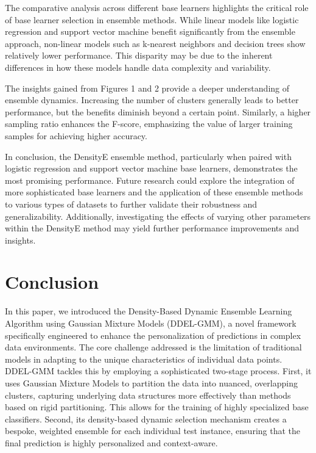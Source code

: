 \documentclass[lettersize,journal]{IEEEtran}
\begin{document}
	The comparative analysis across different base learners highlights the critical role of base learner selection in ensemble methods. While linear models
	like logistic regression and support vector machine benefit significantly from
	the ensemble approach, non-linear models such as k-nearest neighbors and
	decision trees show relatively lower performance. This disparity may be due
	to the inherent differences in how these models handle data complexity and
	variability.
	
	The insights gained from Figures 1 and 2 provide a deeper understanding
	of ensemble dynamics. Increasing the number of clusters generally leads
	to better performance, but the benefits diminish beyond a certain point.
	Similarly, a higher sampling ratio enhances the F-score, emphasizing the
	value of larger training samples for achieving higher accuracy.
	
	In conclusion, the DensityE ensemble method, particularly when paired
	with logistic regression and support vector machine base learners, demonstrates the most promising performance. Future research could explore the
	integration of more sophisticated base learners and the application of these
	ensemble methods to various types of datasets to further validate their robustness and generalizability. Additionally, investigating the effects of varying other parameters within the DensityE method may yield further performance improvements and insights.
	
	
	\section{Conclusion}
	\noindent
	
	In this paper, we introduced the Density-Based Dynamic Ensemble Learning Algorithm using Gaussian Mixture Models (DDEL-GMM), a novel framework specifically engineered to enhance the personalization of predictions in complex data environments. The core challenge addressed is the limitation of traditional models in adapting to the unique characteristics of individual data points. DDEL-GMM tackles this by employing a sophisticated two-stage process. First, it uses Gaussian Mixture Models to partition the data into nuanced, overlapping clusters, capturing underlying data structures more effectively than methods based on rigid partitioning. This allows for the training of highly specialized base classifiers. Second, its density-based dynamic selection mechanism creates a bespoke, weighted ensemble for each individual test instance, ensuring that the final prediction is highly personalized and context-aware.
	
\end{document}

